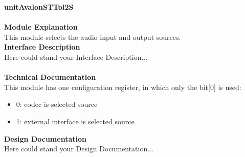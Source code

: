 \documentclass[../../../../doc/ASP-SoC_doc/main.tex]{subfiles}
\begin{document}
\textbf{unitAvalonSTTol2S}
\\\\
\textbf{Module Explanation}
\\
This module selects the audio input and output sources.
\\
\textbf{Interface Description}
\\
Here could stand your Interface Description...\\
\\
\textbf{Technical Documentation}
\\
This module has one configuration register, in which only the bit[0] is used: 
\begin{itemize}
	\item 0: codec is selected source
	\item 1: external interface is selected source
\end{itemize}

\textbf{Design Documentation}
\\
Here could stand your Design Documentation...\\
\\
\end{document}
